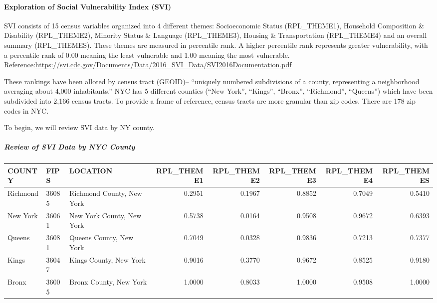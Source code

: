 \documentclass[
]{article}
\begin{document}
\hypertarget{exploration-of-social-vulnerability-index-svi}{%
\paragraph{\texorpdfstring{\textbf{Exploration of Social Vulnerability
Index
(SVI)}}{Exploration of Social Vulnerability Index (SVI)}}\label{exploration-of-social-vulnerability-index-svi}}

SVI consists of 15 census variables organized into 4 different themes:
Socioeconomic Status (RPL\_THEME1), Household Composition \& Disability
(RPL\_THEME2), Minority Status \& Language (RPL\_THEME3), Housing \&
Transportation (RPL\_THEME4) and an overall summary (RPL\_THEMES). These
themes are measured in percentile rank. A higher percentile rank
represents greater vulnerability, with a percentile rank of 0.00 meaning
the least vulnerable and 1.00 meaning the most vulnerable.
Reference:\url{https://svi.cdc.gov/Documents/Data/2016_SVI_Data/SVI2016Documentation.pdf}

These rankings have been alloted by census tract (GEOID)-- ``uniquely
numbered subdivisions of a county, representing a neighborhood averaging
about 4,000 inhabitants.'' NYC has 5 different counties (``New York'',
``Kings'', ``Bronx'', ``Richmond'', ``Queens'') which have been
subdivided into 2,166 census tracts. To provide a frame of reference,
census tracts are more granular than zip codes. There are 178 zip codes
in NYC.

To begin, we will review SVI data by NY county.

\hypertarget{review-of-svi-data-by-nyc-county}{%
\subparagraph{\texorpdfstring{\textbf{Review of SVI Data by NYC
County}}{Review of SVI Data by NYC County}}\label{review-of-svi-data-by-nyc-county}}

\begin{longtable}[]{@{}lllrrrrr@{}}
\toprule
COUNTY & FIPS & LOCATION & RPL\_THEME1 & RPL\_THEME2 & RPL\_THEME3 &
RPL\_THEME4 & RPL\_THEMES\tabularnewline
\midrule
\endhead
Richmond & 36085 & Richmond County, New York & 0.2951 & 0.1967 & 0.8852
& 0.7049 & 0.5410\tabularnewline
New York & 36061 & New York County, New York & 0.5738 & 0.0164 & 0.9508
& 0.9672 & 0.6393\tabularnewline
Queens & 36081 & Queens County, New York & 0.7049 & 0.0328 & 0.9836 &
0.7213 & 0.7377\tabularnewline
Kings & 36047 & Kings County, New York & 0.9016 & 0.3770 & 0.9672 &
0.8525 & 0.9180\tabularnewline
Bronx & 36005 & Bronx County, New York & 1.0000 & 0.8033 & 1.0000 &
0.9508 & 1.0000\tabularnewline
\bottomrule
\end{longtable}
\end{document}
